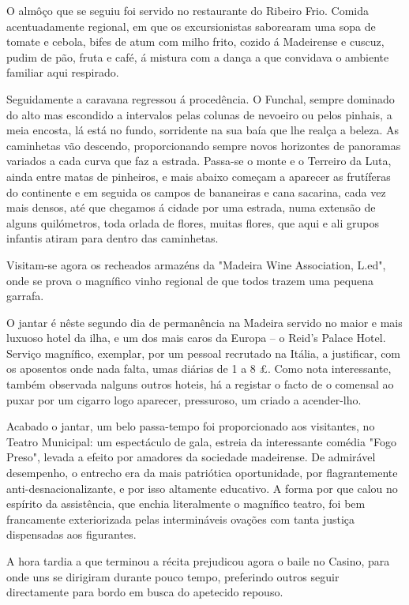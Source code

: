 \documentclass[9pt]{article}
\begin{document}
O almôço que se seguiu foi servido no restaurante do Ribeiro Frio. Comida acentuadamente regional, em que os excursionistas saborearam uma sopa
de tomate e cebola, bifes de atum com mi\-lho frito, cozido á Madeirense e
cuscuz, pudim de pão, fruta e café, á mistura com a dan\-ça a que convidava o
ambiente familiar aqui respirado.

Seguidamente a caravana regressou á procedên\-cia. O Funchal, sempre
dominado do alto mas escondido a intervalos pelas colunas de nevoeiro ou
pelos pinhais, a meia encosta, lá está no fundo, sorridente na sua baía que
\-lhe realça a beleza. As caminhetas vão descendo, pro\-por\-cio\-nando sempre novos
horizontes de panoramas variados a cada curva que faz a estrada.
Passa-se o monte e o Terreiro da Luta, ainda entre matas de pinheiros, e mais
abaixo começam a aparecer as frutíferas do continente e em seguida os campos de bananeiras e cana sacarina, cada vez mais densos, até que chegamos
á cidade por uma estrada, numa extensão de alguns quilómetros, toda orlada
de flores, muitas flores, que aqui e ali grupos infantis atiram para dentro
das caminhetas.

Visitam-se agora os recheados armazéns da "Madeira Wine Association,
L.ed", onde se prova o magnífico vinho regional de que todos trazem uma
pequena garrafa.

O jantar é nês\-te segundo dia de permanência na Madeira servido no
maior e mais luxuoso hotel da i\-lha, e um dos mais caros da Europa -- o Reid's
Palace Hotel. Serviço magnífico, exemplar, por um pessoal recrutado na Itália, a justifi\-car, com os aposentos onde nada falta, umas diárias de 1 a 8 \pounds.
Como nota interessante, também observada nalguns outros hoteis, há a registar o facto de o comensal ao puxar por um cigarro logo aparecer, pressuroso, um criado a acender-lho.

Acabado o jantar, um belo passa-tempo foi proporcionado aos visitantes,
no Teatro Municipal: um espectáculo de gala, estreia da interessante comédia "Fogo Preso", levada a efeito por amadores da sociedade madeirense.
De admirável desempenho, o entrecho era da mais patriótica oportunidade,
por flagrantemente anti-desna\-cio\-nalizante, e por isso altamente educativo.
A forma por que calou no espírito da assistência, que enchia literalmente
o magnífico teatro, foi bem francamente exteriorizada pelas intermináveis
ova\-ções com tanta justiça dispensadas aos figurantes.

A hora tardia a que terminou a récita prejudicou agora o baile no Casino, para onde uns se dirigiram durante pouco tempo,
preferindo outros seguir directamente para bordo em busca do apetecido
repouso.
\end{document}
